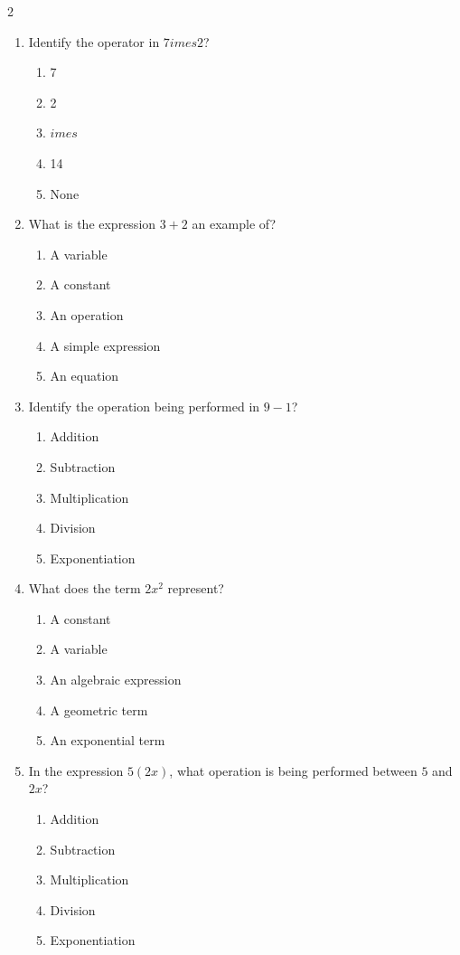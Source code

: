 \documentclass[10pt]{article}
\begin{document}
\begin{multicols}{2}
\begin{enumerate}[label=\textbf{Q\arabic*.}, leftmargin=*, itemsep=6pt, parsep=0pt]
  \item \small Identify the operator in $7 	imes 2$?
  \begin{enumerate}[label=(\Alph*), leftmargin=0.6cm, nosep, itemsep=2pt]
    \item 7
    \item 2
    \item $	imes$
    \item 14
    \item None
  \end{enumerate}

  \item \small What is the expression $3 + 2$ an example of?
  \begin{enumerate}[label=(\Alph*), leftmargin=0.6cm, nosep, itemsep=2pt]
    \item A variable
    \item A constant
    \item An operation
    \item A simple expression
    \item An equation
  \end{enumerate}

  \item \small Identify the operation being performed in $9 - 1$?
  \begin{enumerate}[label=(\Alph*), leftmargin=0.6cm, nosep, itemsep=2pt]
    \item Addition
    \item Subtraction
    \item Multiplication
    \item Division
    \item Exponentiation
  \end{enumerate}

  \item \small What does the term $2x^2$ represent?
  \begin{enumerate}[label=(\Alph*), leftmargin=0.6cm, nosep, itemsep=2pt]
    \item A constant
    \item A variable
    \item An algebraic expression
    \item A geometric term
    \item An exponential term
  \end{enumerate}

  \item \small In the expression $5(2x)$, what operation is being performed between $5$ and $2x$?
  \begin{enumerate}[label=(\Alph*), leftmargin=0.6cm, nosep, itemsep=2pt]
    \item Addition
    \item Subtraction
    \item Multiplication
    \item Division
    \item Exponentiation
  \end{enumerate}

\end{enumerate}
\end{multicols}
\end{document}
